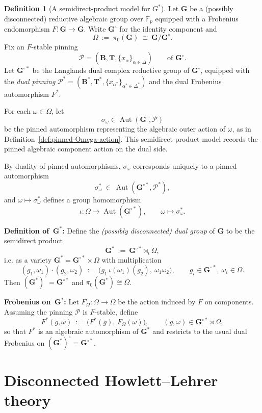 \documentclass{amsart}
\theoremstyle{plain}
\numberwithin{equation}{section}
\theoremstyle{definition}
\newtheorem{definition}[theorem]{Definition}
\newcommand{\Aut}{\operatorname{Aut}}
\newcommand{\bG}{\mathbf{G}}
\newcommand{\bT}{\mathbf{T}}
\newcommand{\bB}{\mathbf{B}}
\newcommand{\F}{\mathbb{F}}
\begin{document}
\begin{definition}[A semidirect-product model for $G^*$]\label{def:dual-semidirect-pinning}
Let $\bG$ be a (possibly disconnected) reductive algebraic group over
$\overline{\F}_p$ equipped with a Frobenius endomorphism $F:\bG\to\bG$.
Write $\bG^\circ$ for the identity component and
\[
\Omega \ :=\ \pi_0(\bG)\ \cong\ \bG/\bG^\circ .
\]
Fix an $F$-stable pinning
\[
\mathcal{P}=(\bB,\bT,\{x_\alpha\}_{\alpha\in\Delta})
\qquad\text{of }\bG^\circ.
\]
Let $\bG^{\circ*}$ be the Langlands dual complex reductive group of
$\bG^\circ$, equipped with the \emph{dual pinning}
$\mathcal{P}^*=(\bB^*,\bT^*,\{x_{\alpha^*}\}_{\alpha^*\in\Delta^*})$
and the dual Frobenius automorphism $F^*$.

For each $\omega\in\Omega$, let
\[
        \sigma_\omega\in\Aut(\bG^\circ,\mathcal P)
\]
be the pinned automorphism representing the algebraic outer action of $\omega$,
as in Definition~\ref{def:pinned-Omega-action}.  This semidirect-product
model records the pinned algebraic component action on the dual side.

By duality of pinned automorphisms, $\sigma_\omega$ corresponds uniquely to a
pinned automorphism
\[
\sigma_\omega^* \ \in\ \Aut(\bG^{\circ*},\mathcal{P}^*),
\]
and $\omega\mapsto \sigma_\omega^*$ defines a group homomorphism
\[
\iota:\Omega\longrightarrow \Aut(\bG^{\circ*}),\qquad
\omega\longmapsto \sigma_\omega^*.
\]

\smallskip
\noindent
\textbf{Definition of $\,\bG^*$:}
Define the \emph{(possibly disconnected) dual group} of $\bG$ to be the
semidirect product
\[
\bG^* \ :=\ \bG^{\circ*}\rtimes_{\iota}\Omega,
\]
i.e. as a variety $\bG^*=\bG^{\circ*}\times\Omega$ with multiplication
\[
(g_1,\omega_1)\cdot(g_2,\omega_2)
\ :=\
\bigl(g_1\,\iota(\omega_1)(g_2),\ \omega_1\omega_2\bigr),
\qquad
g_i\in\bG^{\circ*},\ \omega_i\in\Omega .
\]
Then $(\bG^*)^\circ=\bG^{\circ*}$ and $\pi_0(\bG^*)\cong\Omega$.

\smallskip
\noindent
\textbf{Frobenius on $\,\bG^*$:}
Let $F_\Omega:\Omega\to\Omega$ be the action induced by $F$ on components.
Assuming the pinning $\mathcal{P}$ is $F$-stable, define
\[
F^*(g,\omega)\ :=\ \bigl(F^*(g),\,F_\Omega(\omega)\bigr),
\qquad (g,\omega)\in \bG^{\circ*}\rtimes \Omega,
\]
so that $F^*$ is an algebraic automorphism of $\bG^*$ and restricts to the
usual dual Frobenius on $(\bG^*)^\circ=\bG^{\circ*}$.
\end{definition}
\medskip
\section{Disconnected Howlett--Lehrer theory}\label{sec:disconnected-Howlett-Lehrer-theory}
\end{document}
